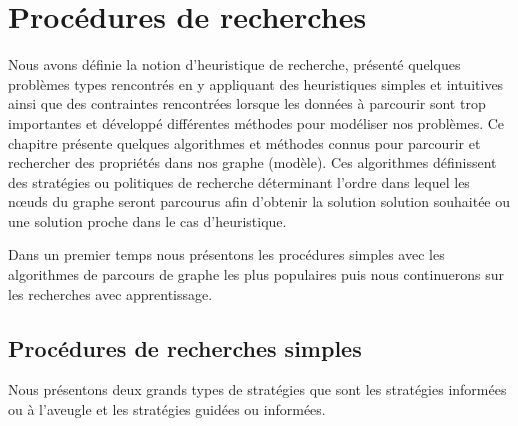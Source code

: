 \chapter{Procédures de recherches}

\label{Chapter2} %

Nous avons définie la notion d'heuristique de recherche, présenté quelques problèmes types rencontrés en y appliquant des heuristiques simples et intuitives ainsi que des contraintes rencontrées lorsque les données à parcourir sont trop importantes et développé différentes méthodes pour modéliser nos problèmes. 
Ce chapitre présente quelques algorithmes et méthodes connus pour parcourir et rechercher des propriétés dans nos graphe (modèle).
Ces algorithmes définissent des stratégies ou politiques de recherche déterminant l'ordre dans lequel les nœuds du graphe seront parcourus afin d'obtenir la solution solution souhaitée ou une solution proche dans le cas d'heuristique.

Dans un premier temps nous présentons les procédures simples avec les algorithmes de parcours de graphe les plus populaires puis nous continuerons sur les recherches avec apprentissage.

\section{Procédures de recherches simples}
Nous présentons deux grands types de stratégies que sont les stratégies informées ou à l'aveugle et les stratégies guidées ou informées.


